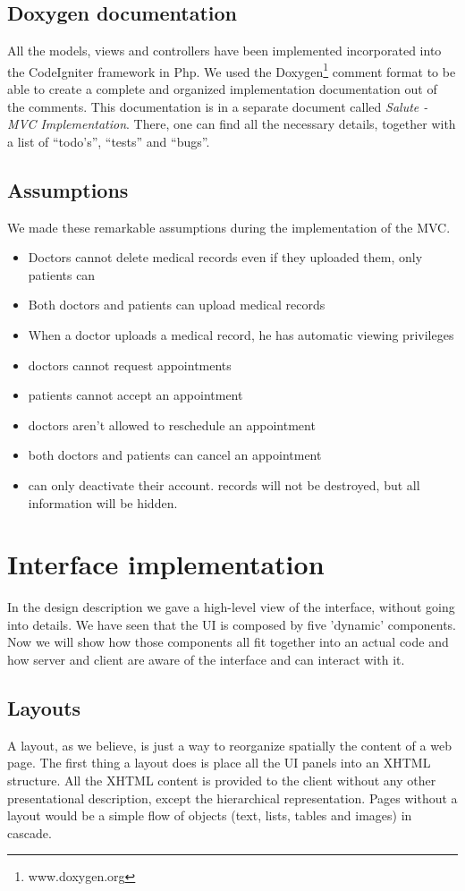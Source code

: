 \subsection{Doxygen documentation}
All the models, views and controllers have been implemented incorporated into the CodeIgniter framework in Php. We used the Doxygen\footnote{www.doxygen.org} comment format to be able to create a complete and organized implementation documentation out of the comments. This documentation is in a separate document called \emph{Salute - MVC Implementation}. There, one can find all the necessary details, together with a list of ``todo's'', ``tests'' and  ``bugs''.

\subsection{Assumptions}
We made these remarkable assumptions during the implementation of the MVC.
\begin{itemize}
\item Doctors cannot delete medical records even if they uploaded them, only patients can
\item Both doctors and patients can upload medical records
\item When a doctor uploads a medical record, he has automatic viewing privileges
\item doctors cannot request appointments
\item patients cannot accept an appointment
\item doctors aren't allowed to reschedule an appointment
\item both doctors and patients can cancel an appointment
\item can only deactivate their account. records will not be destroyed, but all information will be hidden. 
\end{itemize}

\section{Interface implementation}
In the design description we gave a high-level view of the interface, without going into details. We have seen that the UI is composed by five 'dynamic' components. Now we will show how those components all fit together into an actual code and how server and client are aware of the interface and can interact with it.

\subsection{Layouts}
A layout, as we believe, is just a way to reorganize spatially the content of a web page. The first thing a layout does is place all the UI panels into an XHTML structure. All the XHTML content is provided to the client without any other presentational description, except the hierarchical representation. Pages without a layout would be a simple flow of objects (text, lists, tables and images) in cascade.

